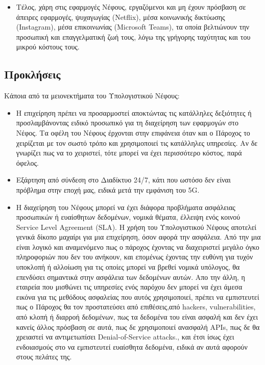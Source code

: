 \documentclass{article}
\begin{document}
\begin{itemize}
\item	Τέλος, χάρη στις εφαρμογές Νέφους, εργαζόμενοι και μη έχουν πρόσβαση σε άπειρες εφαρμογές, ψυχαγωγίας (Netflix), μέσα κοινωνικής δικτύωσης (Instagram), μέσα επικοινωνίας (Microsoft Teams), τα οποία βελτιώνουν την προσωπική και επαγγελματική ζωή τους, λόγω της γρήγορης ταχύτητας και του μικρού κόστους τους.
\end{itemize}

\subsection{Προκλήσεις}
Κάποια από τα μειονεκτήματα του Υπολογιστικού Νέφους:
\begin{itemize}
\item	Η επιχείρηση πρέπει να προσαρμοστεί αποκτώντας τις κατάλληλες δεξιότητες ή προσλαμβάνοντας ειδικό προσωπικό για τη διαχείρηση των εφαρμογών στο Νέφος. Τα οφέλη του Νέφους έρχονται στην επιφάνεια όταν και ο Πάροχος το χειρίζεται με τον σωστό τρόπο και χρησιμοποιεί τις κατάλληλες υπηρεσίες. Αν δε γνωρίζει πως να το χειριστεί, τότε μπορεί να έχει περισσότερο κόστος, παρά όφελος.
\item	Εξάρτηση από σύνδεση στο Διαδίκτυο 24/7, κάτι που ωστόσο δεν είναι πρόβλημα στην εποχή μας, ειδικά μετά την εμφάνιση του 5G.
\item	Η διαχείρηση του Νέφους μπορεί να έχει διάφορα προβλήματα ασφάλειας προσωπικών ή ευαίσθητων δεδομένων,  νομικά θέματα, έλλειψη ενός κοινού Service Level Agreement (SLA). Η χρήση του Υπολογιστικού Νέφους αποτελεί γενικά δίκοπο μαχαίρι για μια επιχείρηση, όσον αφορά την ασφάλεια. Από την μια είναι λογικό και αναμενόμενο πως ο πάροχος έχοντας να διαχειριστεί μεγάλο όγκο πληροφοριών που δεν του ανήκουν, και επομένως έχοντας την ευθύνη για τυχόν υποκλοπή ή αλλοίωση για τις οποίες μπορεί να βρεθεί νομικά υπόλογος, θα επενδύσει σημαντικά στην ασφάλεια των δεδομένων αυτών. Απο την άλλη, η εταιρεία που μισθώνει τις υπηρεσίες ενός παρόχου δεν μπορεί  να έχει άμεσα εικόνα για τις μεθόδους ασφαλείας που αυτός χρησιμοποιεί, πρέπει να εμπιστευτεί πως ο Πάροχος θα τον προστατεύσει από επιθέσεις,από hackers, vulnerabilities, από κλοπή ή διαρροή δεδομένων, πως τα δεδομένα του είναι ασφαλή και δεν έχει κανείς άλλος πρόσβαση σε αυτά, πως δε χρησιμοποιεί ανασφαλή APIs, πως δε θα χρειαστεί να αντιμετωπίσει  Denial-of-Service attacks., και έτσι ίσως έχει ενδοιασμούς στο να εμπιστευτεί ευαίσθητα δεδομένα, ειδικά αν αυτά αφορούν στους πελάτες της.

\end{itemize}
\end{document}
